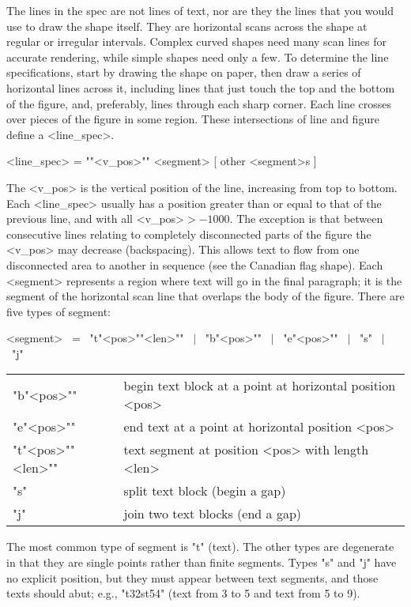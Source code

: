 \documentclass[draft]{article}
\makeatletter
\DeclareRobustCommand{\_}{%
  \ifmmode \nfss@text{\textunderscore}\else \BreakableUnderscore \fi}
\makeatother
\begin{document}
The lines in the spec are not lines of text, nor are they the lines
that you would use to draw the shape itself.  They are horizontal
scans across the shape at regular or irregular intervals.  Complex
curved shapes need
many scan lines for accurate rendering, while simple shapes need only
a few.  To determine the line specifications, start by drawing the
shape on paper, then draw a series of horizontal lines across it,
including lines that just touch the top and the bottom of the figure,
and, preferably, lines through each sharp corner.
Each line crosses over pieces of the figure in some region.  These 
intersections of line and figure define a <line_spec>.

\begin{flushleft}
<line_spec> = "{"<v_pos>"}" <segment> [ other <segment>s ]
\end{flushleft}

\noindent
The <v_pos> is the vertical position of the line, increasing from top to
bottom.  Each <line_spec> usually has a position greater than or equal
to that of the previous line, and with all <v_pos>${} > -1000$. The
exception is that between consecutive lines relating to completely
disconnected parts of the figure the <v_pos> may decrease (backspacing).
This allows text to flow from one disconnected area to another in
sequence (see the Canadian flag shape). Each <segment> represents a
region where text will go in the final paragraph; it is the segment of
the horizontal scan line that overlaps the body of the figure.  There
are five types of segment:

\begin{flushleft}
<segment> \ = \ "t{"<pos>"}{"<len>"}" \ $|$ \ "b{"<pos>"}" \ $|$ \ 
          "e{"<pos>"}" \ $|$ \ "s" \ $|$ \ "j"        \\[\topsep]
\begin{tabular}{ll}
  "b{"<pos>"}" & begin text block at a point at horizontal position <pos>\\
  "e{"<pos>"}" & end text at a point at horizontal position <pos>\\
  "t{"<pos>"}{"<len>"}"  & text segment at position <pos> with length <len>\\
  "s"          & split text block (begin a gap)\\
  "j"          & join two text blocks (end a gap)
\end{tabular}
\end{flushleft}

The most common type of segment is "t" (text).  The other types are
degenerate in that they are single points rather than finite segments.
Types "s" and "j" have no explicit position, but they must appear between
text segments, and those texts should abut; e.g.,  "t{3}{2}st{5}{4}"
(text from 3 to 5 and text from 5 to 9).
\end{document}
